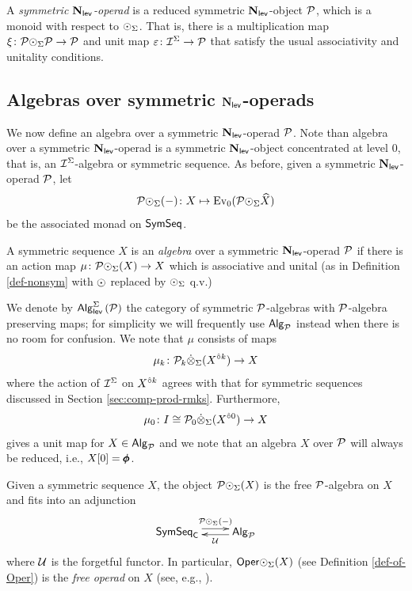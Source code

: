 \begin{definition} \label{def:sym-Nl}
    A \textit{symmetric $\mathbf{N}_{\mathsf{lev}}$-operad} is a reduced symmetric $\mathbf{N}_{\mathsf{lev}}$-object $\mathcal{P}$, which is a monoid with respect to ${\odot}_{\Sigma}$. That is, there is a multiplication map $\xi\colon \mathcal{P}{\odot}_{\Sigma}\mathcal{P}\to \mathcal{P}$ and unit map $\varepsilon \colon \mathcal{I}^{\Sigma} \to \mathcal{P}$ that satisfy the usual associativity and unitality conditions. 
\end{definition}

\subsection{Algebras over symmetric $\mathbf{N}_{\mathsf{lev}}$-operads} \label{sec:algebras}
We now define an algebra over a symmetric $\mathbf{N}_{\mathsf{lev}}$-operad $\mathcal{P}$. Note than algebra over a symmetric $\mathbf{N}_{\mathsf{lev}}$-operad is a symmetric $\mathbf{N}_{\mathsf{lev}}$-object concentrated at level $0$, that is, an $\mathcal{I}^{\Sigma}$-algebra or symmetric sequence. As before, given a symmetric $\mathbf{N}_{\mathsf{lev}}$-operad $\mathcal{P}$, let  \[\mathcal{P}{\odot}_{\Sigma}(-)\colon X\mapsto \mathrm{Ev}_0(\mathcal{P} {\odot}_{\Sigma}  \widehat{X})\] be the associated monad on $\mathsf{SymSeq}$.

\begin{definition} 
    A symmetric sequence $X$ is an \textit{algebra} over a symmetric $\mathbf{N}_{\mathsf{lev}}$-operad $\mathcal{P}$ if there is an action map $\mu\colon \mathcal{P}{\odot}_{\Sigma} (X) \to X$ which is associative and unital (as in Definition \ref{def-nonsym} with ${\odot}$ replaced by ${\odot}_{\Sigma}$ q.v.)
\end{definition}

We denote by $\mathsf{Alg}^{\Sigma}_{\mathsf{lev}}\left(\mathcal{P}\right)$ the category of symmetric $\mathcal{P}$-algebras with $\mathcal{P}$-algebra preserving maps; for simplicity we will frequently use ${\mathsf{Alg}_{\mathcal{P}}}$ instead when there is no room for confusion. We note that $\mu$ consists of maps \[\mu_k \colon \mathcal{P}_k \dot{\otimes}_{\Sigma} (X^{\hat{\circ} k})\to X\] where the action of $\mathcal{I}^{\Sigma}$ on $X^{\hat{\circ} k}$ agrees with that for symmetric sequences discussed in Section \ref{sec:comp-prod-rmks}. Furthermore, \[\mu_0\colon I\cong \mathcal{P}_0\dot{\otimes}_{\Sigma}  (X^{\hat{\circ} 0}) \to X\] gives a unit map for $X\in {\mathsf{Alg}_{\mathcal{P}}}$ and we note that an algebra $X$ over $\mathcal{P}$ will always be reduced, i.e., $X[0]=\pmb{\phi}$.

\begin{example} 
    Given a symmetric sequence $X$, the object $\mathcal{P}{\odot}_{\Sigma}(X)$ is the free $\mathcal{P}$-algebra on $X$ and fits into an adjunction \[ \xymatrix{ 
        \SymSeq_{\mathsf{C}} \ar@<.75ex>[r]^-{\Cal{P}\circdot_{\Sigma}(-)} 
        & 
        \Alg{P} \ar@<.5ex>[l]^-{\Cal{U}} 
    }\] where $\mathcal{U}$ is the forgetful functor. In particular, $\mathsf{Oper} {\odot}_{\Sigma}(X)$ (see Definition \ref{def-of-Oper}) is the \textit{free operad} on $X$ (see, e.g.,  \cite[9.4]{AC-1}).
\end{example}

